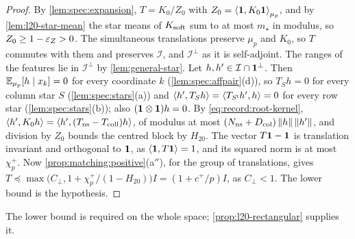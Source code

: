 \begin{proof}
By \cref{lem:spec:expansion}, $T=K_0/Z_0$ with $Z_0=\left\langle \mathbf 1,K_0\mathbf 1\right\rangle_{\mu_p}$,
and by \cref{lem:l20-star-mean} the star means of $K_{\rm soft}$ sum to at most
$m_\star$ in modulus, so $Z_0\ge1-\varepsilon_Z>0$. The simultaneous translations
preserve $\mu_p$ and $K_0$, so $T$ commutes with them and preserves
$\mathcal I$, and $\mathcal I^\perp$ as it is self-adjoint. The ranges of the
features lie in $\mathcal I^\perp$ by \cref{lem:general-star}. Let
$h,h'\in\mathcal I\cap\mathbf 1^\perp$. Then $\mathbb E_{\mu_p}[h\mid x_k]=0$ for every
coordinate $k$ (\cref{lem:spec:affpair}(d)), so $T_Sh=0$ for every column star
$S$ (\cref{lem:spec:stars}(a)) and
$\left\langle h',T_Sh\right\rangle=\left\langle T_{S^{\mathsf t}}h',h\right\rangle=0$ for every row star
(\cref{lem:spec:stars}(b)); also $(\mathbf 1\otimes\mathbf 1)h=0$. By
\eqref{eq:record:root-kernel},
$\left\langle h',K_0h\right\rangle=\left\langle h',(T_{\rm ns}-T_{\rm coll})h\right\rangle$, of modulus at most
$(N_{\rm ns}+D_{\rm col})\left\|h\right\|\left\|h'\right\|$, and division by $Z_0$ bounds the
centred block by $H_{20}$. The vector $T\mathbf 1-\mathbf 1$ is translation invariant
and orthogonal to $\mathbf 1$, as $\left\langle \mathbf 1,T\mathbf 1\right\rangle=1$, and its squared norm is at
most $\chi^+_p$. Now \cref{prop:matching:positive}(a$''$), for the group of
translations, gives
$T\preceq\max\bigl(C_\perp,1+\chi^+_p/(1-H_{20})\bigr)I=(1+c^+/p)I$, as
$C_\perp<1$. The lower bound is the hypothesis.
\end{proof}

The lower bound is required on the whole space;
\cref{prop:l20-rectangular} supplies it.

